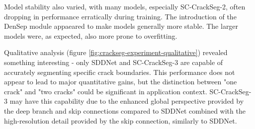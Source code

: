 \documentclass[a4paper,12pt]{report}
\begin{document}
Model stability also varied, with many models, especially SC-CrackSeg-2, often dropping in performance erratically during training. The introduction of the DenSep module appaeared to make models generally more stable. The larger models were, as expected, also more prone to overfitting.

Qualitative analysis (figure \ref{fig:crackseg-experiment-qualitative}) revealed something interesting - only SDDNet and SC-CrackSeg-3 are capable of accurately segmenting specific crack boundaries. This performance does not appear to lead to major quantitative gains, but the distinction between "one crack" and "two cracks" could be significant in application context. SC-CrackSeg-3 may have this capability due to the enhanced global perspective provided by the deep branch and skip connections compared to SDDNet combined with the high-resolution detail provided by the skip connection, similarly to SDDNet.
\end{document}
